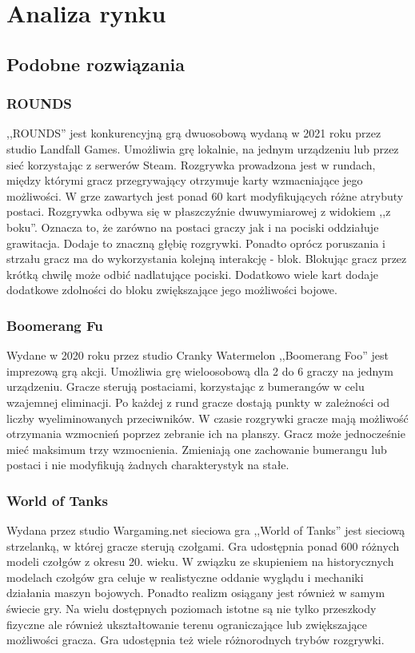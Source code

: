 \chapter{Analiza rynku}
\section{Podobne rozwiązania}

\subsection{ROUNDS}
,,ROUNDS'' jest konkurencyjną grą dwuosobową wydaną w 2021 roku przez studio Landfall Games\cite{rounds}. Umożliwia grę lokalnie, na jednym urządzeniu lub przez sieć korzystając z serwerów Steam. Rozgrywka prowadzona jest w rundach, między którymi gracz przegrywający otrzymuje karty wzmacniające jego możliwości. W grze zawartych jest ponad 60 kart modyfikujących różne atrybuty postaci. Rozgrywka odbywa się w płaszczyźnie dwuwymiarowej z widokiem ,,z boku''. Oznacza to, że zarówno na postaci graczy jak i na pociski oddziałuje grawitacja. Dodaje to znaczną głębię rozgrywki. Ponadto oprócz poruszania i strzału gracz ma do wykorzystania kolejną interakcję - blok. Blokując gracz przez krótką chwilę może odbić nadlatujące pociski. Dodatkowo wiele kart dodaje dodatkowe zdolności do bloku zwiększające jego możliwości bojowe.

\subsection{Boomerang Fu}
Wydane w 2020 roku przez studio Cranky Watermelon ,,Boomerang Foo'' jest imprezową grą akcji\cite{boomerang_fu}. Umożliwia grę wieloosobową dla 2 do 6 graczy na jednym urządzeniu. Gracze sterują postaciami, korzystając z bumerangów w celu wzajemnej eliminacji. Po każdej z rund gracze dostają punkty w zależności od liczby wyeliminowanych przeciwników. W czasie rozgrywki gracze mają możliwość otrzymania wzmocnień poprzez zebranie ich na planszy. Gracz może jednocześnie mieć maksimum trzy wzmocnienia. Zmieniają one zachowanie bumerangu lub postaci i nie modyfikują żadnych charakterystyk na stałe.

\subsection{World of Tanks}
Wydana przez studio Wargaming.net sieciowa gra ,,World of Tanks'' jest sieciową strzelanką, w której gracze sterują czołgami\cite{worldoftanks}. Gra udostępnia ponad 600 różnych modeli czołgów z okresu 20. wieku. W związku ze skupieniem na historycznych modelach czołgów gra celuje w realistyczne oddanie wyglądu i mechaniki działania maszyn bojowych. Ponadto realizm osiągany jest również w samym świecie gry. Na wielu dostępnych poziomach istotne są nie tylko przeszkody fizyczne ale również ukształtowanie terenu ograniczające lub zwiększające możliwości gracza. Gra udostępnia też wiele różnorodnych trybów rozgrywki.


